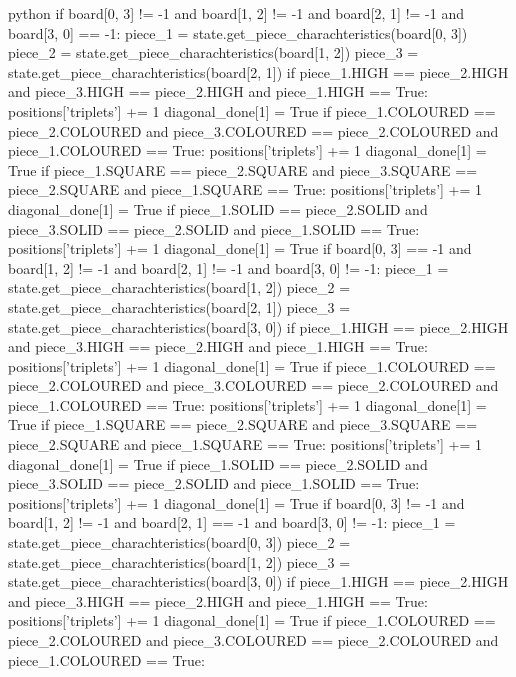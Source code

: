 \begin{mintedbox}{python}
    if board[0, 3] != -1 and board[1, 2] != -1 and board[2, 1] != -1 and board[3, 0] == -1:
        piece_1 = state.get_piece_charachteristics(board[0, 3])
        piece_2 = state.get_piece_charachteristics(board[1, 2])
        piece_3 = state.get_piece_charachteristics(board[2, 1])
        if piece_1.HIGH == piece_2.HIGH and piece_3.HIGH == piece_2.HIGH and piece_1.HIGH == True:
            positions['triplets'] += 1
            diagonal_done[1] = True
        if piece_1.COLOURED == piece_2.COLOURED and piece_3.COLOURED == piece_2.COLOURED and piece_1.COLOURED == True:
            positions['triplets'] += 1
            diagonal_done[1] = True
        if piece_1.SQUARE == piece_2.SQUARE and piece_3.SQUARE == piece_2.SQUARE and piece_1.SQUARE == True:
            positions['triplets'] += 1
            diagonal_done[1] = True
        if piece_1.SOLID == piece_2.SOLID and piece_3.SOLID == piece_2.SOLID and piece_1.SOLID == True:
            positions['triplets'] += 1
            diagonal_done[1] = True
    if board[0, 3] == -1 and board[1, 2] != -1 and board[2, 1] != -1 and board[3, 0] != -1:
        piece_1 = state.get_piece_charachteristics(board[1, 2])
        piece_2 = state.get_piece_charachteristics(board[2, 1])
        piece_3 = state.get_piece_charachteristics(board[3, 0])
        if piece_1.HIGH == piece_2.HIGH and piece_3.HIGH == piece_2.HIGH and piece_1.HIGH == True:
            positions['triplets'] += 1
            diagonal_done[1] = True
        if piece_1.COLOURED == piece_2.COLOURED and piece_3.COLOURED == piece_2.COLOURED and piece_1.COLOURED == True:
            positions['triplets'] += 1
            diagonal_done[1] = True
        if piece_1.SQUARE == piece_2.SQUARE and piece_3.SQUARE == piece_2.SQUARE and piece_1.SQUARE == True:
            positions['triplets'] += 1
            diagonal_done[1] = True
        if piece_1.SOLID == piece_2.SOLID and piece_3.SOLID == piece_2.SOLID and piece_1.SOLID == True:
            positions['triplets'] += 1
            diagonal_done[1] = True
    if board[0, 3] != -1 and board[1, 2] != -1 and board[2, 1] == -1 and board[3, 0] != -1:
        piece_1 = state.get_piece_charachteristics(board[0, 3])
        piece_2 = state.get_piece_charachteristics(board[1, 2])
        piece_3 = state.get_piece_charachteristics(board[3, 0])
        if piece_1.HIGH == piece_2.HIGH and piece_3.HIGH == piece_2.HIGH and piece_1.HIGH == True:
            positions['triplets'] += 1
            diagonal_done[1] = True
        if piece_1.COLOURED == piece_2.COLOURED and piece_3.COLOURED == piece_2.COLOURED and piece_1.COLOURED == True:

\end{mintedbox}
